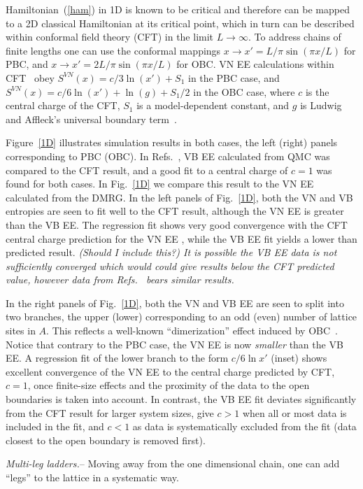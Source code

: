 \documentclass[prl,aps,twocolumn,floatfix,amsmath,amssymb,superscriptaddress,tightenlines]{revtex4}
\begin{document}
Hamiltonian~(\ref{ham}) in 1D is known to be critical and therefore can be
mapped to a 2D classical Hamiltonian at its critical point, which in turn
can be described within conformal field theory (CFT) in the limit
$L\to\infty$.  To address chains of finite lengths one can use the
conformal mappings $x\to x'=L/\pi \sin(\pi x / L)$ for PBC, and $x\to
x'=2L/\pi \sin(\pi x / L)$ for OBC. VN EE calculations within
CFT~\cite{Cardy, Scholl06} obey $S^{VN}(x)= c/3 \ln(x') + S_1$ in the PBC
case, and $S^{VN}(x)= c/6 \ln(x') + \ln(g)+S_1/2$ in the OBC case, where
$c$ is the central charge of the CFT, $S_1$ is a model-dependent constant,
and $g$ is Ludwig and Affleck's universal boundary
term~\cite{AffleckAndLudwig}.

Figure~\ref{1D} illustrates simulation results in both cases, the left
(right) panels corresponding to PBC (OBC). In Refs.~\cite{Alet, Chh}, VB
EE calculated from QMC was compared to the CFT result, and a good fit to
a central charge of $c=1$ was found for both cases.  In Fig.~\ref{1D} we
compare this result to the VN EE calculated from the DMRG.  
In the left panels of Fig.~\ref{1D}, both the VN and VB entropies are seen
to fit well to the CFT result, although the VN EE is greater than the VB
EE. The regression fit shows very good convergence with the CFT central
charge prediction for the VN EE , while the VB EE fit yields a lower than
predicted result. {\it (Should I include this?) It is possible the VB EE
data is not sufficiently converged which would could give results below
the CFT predicted value, however data from Refs.~\cite{Alet,Chh} bears
similar results. }

In the right panels of Fig.~\ref{1D}, both the VN and VB EE are seen to
split into two branches, the upper (lower) corresponding to an odd (even)
number of lattice sites in $A$.  This reflects a well-known
``dimerization'' effect induced by OBC~\cite{Ian1}.  Notice that contrary
to the PBC case, the VN EE is now \textit{smaller} than the VB EE. A
regression fit of the lower branch to the form $c/6 \ln {x'}$ (inset)
shows excellent convergence of the VN EE to the central charge predicted
by CFT, $c=1$, once finite-size effects and the proximity of the data to
the open boundaries is taken into account.  In contrast, the VB EE fit
deviates significantly from the CFT result for larger system sizes, give
$c>1$ when all or most data is included in the fit, and $c<1$ as data is
systematically excluded from the fit (data closest to the open boundary is
removed first).

{\it Multi-leg ladders.}-- Moving away from the one dimensional chain, one
can add ``legs'' to the lattice in a systematic way. 
\end{document}
